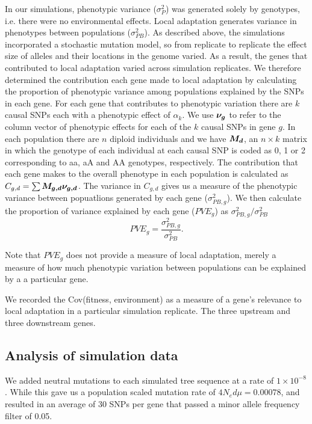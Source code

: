 \documentclass[11pt,twoside,lineno]{GSA_format}
\newcommand{\bm}[1]{\mbox{\boldmath{$#1$}}}
\begin{document}
In our simulations, phenotypic variance ($\sigma^{2}_{P}$) was generated solely by genotypes, i.e. there were no environmental effects. Local adaptation generates variance in phenotypes between populations ($\sigma^{2}_{PB}$). 
As described above, the simulations incorporated a stochastic mutation model, so from replicate to replicate the effect size of alleles and their locations in the genome varied. As a result, the genes that contributed to local adaptation varied across simulation replicates. We therefore determined the contribution  each gene made to local adaptation by calculating the proportion of phenotypic variance among populations explained by the SNPs in each gene. For each gene that contributes to phenotypic variation there are $k$ causal SNPs each with a phenotypic effect of $\alpha_k$. We use $\bm{\nu_g}$ to refer to the column vector of phenotypic effects for each of the $k$ causal SNPs in gene $g$. In each population there are $n$ diploid individuals and we have $\bm{M_d}$, an $n \times k$ matrix in which the genotype of each individual at each causal SNP is coded as 0, 1 or 2 corresponding to aa, aA and AA genotypes, respectively. The contribution that each gene makes to the overall phenotype in each population is calculated as $C_{g,d} = \sum \bm{M_{g,d} \nu_{g,d}}$. The variance in $C_{g,d}$ gives us a measure of the phenotypic variance between popuatlions generated by each gene ($\sigma^{2}_{PB,g}$). We then calculate the proportion of variance explained by each gene ($PVE_g$) as $\sigma^{2}_{PB,g} / \sigma^{2}_{PB}$
\begin{equation}
PVE_g = \frac{\sigma^{2}_{PB,g}}{\sigma^{2}_{PB}}.
\end{equation}

Note that $PVE_g$ does not provide a measure of local adaptation, merely a measure of how much phenotypic variation between populations can be explained by a a particular gene. 

We recorded the Cov(fitness, environment) as a measure of a gene's relevance to local adaptation in a particular simulation replicate. The three upstream and three downstream genes.


\subsection{Analysis of simulation data}

We added neutral mutations to each simulated tree sequence at a rate of $1\times10^{-8}$. While this gave us a population scaled mutation rate of $4N_ed\mu = 0.00078$, and resulted in an average of 30 SNPs per gene that passed a minor allele frequency filter of 0.05.
\end{document}
